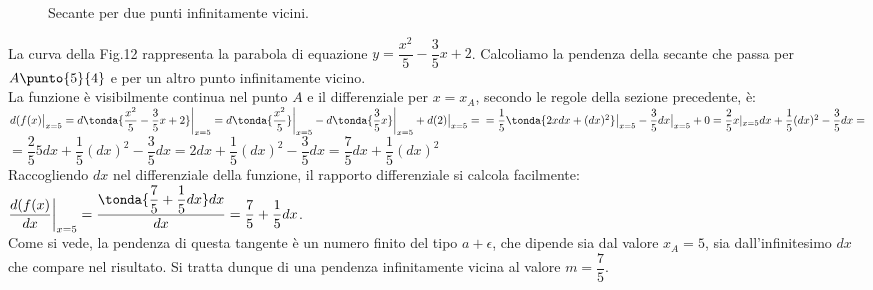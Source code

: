\begin{figure}[h]
\begin{inaccessibleblock}
 \begin{center}
\secRD
 \end{center}
\end{inaccessibleblock}
\caption{Secante per due punti infinitamente vicini.} \label{fig:diff01_tangente}
\end{figure}

\begin{esempio}
  La curva della Fig.12 rappresenta la parabola di equazione 
  $y=\dfrac{x^2}{5}-\dfrac{3}{5}x+2$. Calcoliamo la pendenza della secante che
  passa per $A\punto{5}{4}$ e per un altro punto infinitamente vicino.\\
  La funzione è visibilmente continua nel punto $A$ e il differenziale per 
  $x=x_A$, secondo le regole della sezione precedente, è:\\ 
  $d(f(x)\big|_{x=5}=d\tonda{\dfrac{x^2}{5}-\dfrac{3}{5}x+2}\bigg|_{x=5}=
  d\tonda{\dfrac{x^2}{5}}\bigg|_{x=5}-d\tonda{\dfrac{3}{5}x}\bigg|_{x=5}+
  d(2)\big|_{x=5}=\\
  =\dfrac{1}{5}\tonda{2xdx+(dx)^2}\big|_{x=5}-\dfrac{3}{5}dx\big|_{x=5}+0=
  \dfrac{2}{5}x|_{x=5}dx+\dfrac{1}{5}(dx)^2-\dfrac{3}{5}dx=$\\
  $=\dfrac{2}{5}5dx+\dfrac{1}{5}(dx)^2-\dfrac{3}{5}dx=
  2dx+\dfrac{1}{5}(dx)^2-\dfrac{3}{5}dx=
  \dfrac{7}{5}dx+\dfrac{1}{5}(dx)^2$\\
  Raccogliendo $dx$ nel differenziale della funzione, il rapporto differenziale 
  si calcola facilmente:\\
  $\dfrac{d(f(x)}{dx}\bigg|_{x=5}=\dfrac{\tonda{\dfrac{7}{5}+\dfrac{1}{5}dx}dx}
  {dx}=\dfrac{7}{5}+\dfrac{1}{5}dx$.\\
  Come si vede, la pendenza di questa tangente è un numero finito del tipo 
  $a+\epsilon$, che dipende sia dal valore $x_A=5$, sia dall'infinitesimo 
  $dx$ che compare nel risultato. Si tratta dunque di una pendenza 
  infinitamente vicina al valore $m=\dfrac{7}{5}$.
\end{esempio}

